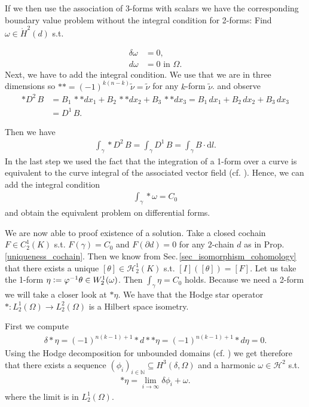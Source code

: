 \documentclass[12pt,a4paper]{article}
\theoremstyle{definition}
\begin{document}
If we then use the association of
3-forms with scalars we have the corresponding boundary value problem without
the integral condition for 
2-forms: Find $\omega \in \mathring{H}^2(d)$ s.t.

\begin{align}
    \delta \omega &= 0, \\ 
    d\omega  &= 0 \text{ in } \Omega.
\end{align}
Next, we have to add the integral condition. 
We use that we are in three dimensions so
$**=(-1)^{k(n-k)}\tilde{\nu} = \tilde{\nu}$ \cite[p.66]{arnold} for any
$k$-form $\tilde{\nu}$.
and observe
\begin{align*}
    *D^2 \, B  &= B_1 \, **dx_1 + B_2 \, **dx_2 + B_3\, **dx_3 
        = B_1 \, dx_1 + B_2 \, dx_2 + B_3\, dx_3\\ 
    &= D^1 \, B.
\end{align*}

Then we have 
\begin{align*}
    \int_\gamma * D^2\, B = \int_\gamma D^1\, B = \int_\gamma B \cdot \text{d}l.
\end{align*}
In the last step we used the fact that the integration of a 1-form over a
curve is equivalent to the curve integral of the associated vector field
(cf. \cite[Sec. 6.2.3]{arnold}). Hence, we can add the integral condition 
\begin{align}
    \int_\gamma *\omega = C_0 \label{integral_condition}
\end{align}
and obtain the equivalent problem on differential forms.


We are now able to proof existence of a 
solution. Take a closed cochain $F \in C^1_2(K)$ s.t. $F(\gamma) = C_0$ 
and 
$F(\partial d) = 0$ for any $2$-chain $d$ 
as in Prop.\,\ref{uniqueness_cochain}. Then we know from 
Sec.\,\ref{sec_isomorphism_cohomology} that 
there exists a unique $[\theta] \in \mathscr{H}_2^1(K)$ s.t. 
$[I]([\theta]) = [F]$. Let us take the 1-form $\eta \vcentcolon= 
\varphi^{-1} \theta \in W^1_2(\omega)$. Then $\int_\gamma \eta = C_0$ holds. 
Because we need a 2-form we will take a closer look at $*\eta$.
We have that the Hodge star operator $*: L^1_2(\Omega) \rightarrow 
L^2_2(\Omega)$ is a Hilbert space isometry. 


First we compute
\begin{align*}
    \delta *\eta = (-1)^{n(k-1)+1} *d**\eta = (-1)^{n(k-1)+1} *d\eta = 0.
\end{align*}
Using the Hodge decomposition for unbounded domains 
(cf. \cite[Lemma 1]{picard}) we get therefore that there exists 
a sequence  $(\phi_i)_{i\in \mathbb{N}} \subseteq H^3(\delta,\Omega)$ 
and a harmonic $\omega \in \mathcal{H}^2$ s.t. %
\begin{align*}
    *\eta = \lim\limits_{i \rightarrow \infty} \delta \phi_i + \omega.
\end{align*}
where the limit is in $L^1_2(\Omega)$. 
\end{document}
